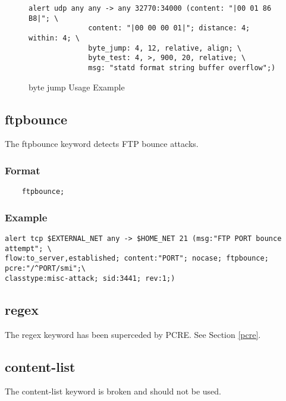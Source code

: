 \documentclass[english]{report}
\begin{document}
\begin{figure}[!hbpt]
\begin{verbatim}
alert udp any any -> any 32770:34000 (content: "|00 01 86 B8|"; \
              content: "|00 00 00 01|"; distance: 4; within: 4; \
              byte_jump: 4, 12, relative, align; \
              byte_test: 4, >, 900, 20, relative; \
              msg: "statd format string buffer overflow";)
\end{verbatim}
\caption{byte jump Usage Example \label{fig:byte_jump}}
\end{figure}

\subsection{ftpbounce}

The ftpbounce keyword detects FTP bounce attacks.

\subsubsection{Format}
                                                                                
\begin{verbatim}
	ftpbounce;
\end{verbatim}

\subsubsection{Example}
\begin{verbatim}
alert tcp $EXTERNAL_NET any -> $HOME_NET 21 (msg:"FTP PORT bounce attempt"; \
flow:to_server,established; content:"PORT"; nocase; ftpbounce; pcre:"/^PORT/smi";\
classtype:misc-attack; sid:3441; rev:1;)
\end{verbatim}

\subsection{regex}

The regex keyword has been superceded by PCRE.  See Section \ref{pcre}.

\subsection{content-list}

The content-list keyword is broken and should not be used.
\end{document}
